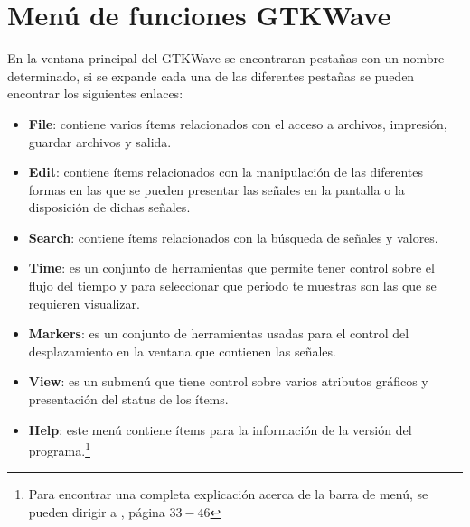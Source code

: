 \documentclass[10pt,graphicx,caption,rotating]{article}
\begin{document}
\section{Menú de funciones GTKWave}
\noindent
En la ventana principal del GTKWave se encontraran pestañas con un nombre determinado, si se expande cada una de las diferentes pestañas se pueden encontrar los siguientes enlaces:
\begin{itemize}
 \item \textbf{File}: contiene varios ítems relacionados con el acceso a archivos, impresión, guardar archivos y salida.
 \item \textbf{Edit}: contiene ítems relacionados con la manipulación de las diferentes formas en las que se pueden presentar las señales en la pantalla o la disposición de dichas señales.
 \item \textbf{Search}: contiene ítems relacionados con la búsqueda de señales y valores.
 \item \textbf{Time}: es un conjunto de herramientas que permite tener control sobre el flujo del tiempo y para seleccionar que periodo te muestras son las que se requieren visualizar.
 \item \textbf{Markers}: es un conjunto de herramientas usadas para el control del desplazamiento en la ventana que contienen las señales.
 \item \textbf{View}: es un submenú que tiene control sobre varios atributos gráficos y presentación del status de los ítems.
 \item \textbf{Help}: este menú contiene ítems para la información de la versión del programa.\footnote{Para encontrar una completa explicación acerca de la barra de menú, se pueden dirigir a \cite{page1}, página $33-46$}
\end{itemize}
\end{document}
